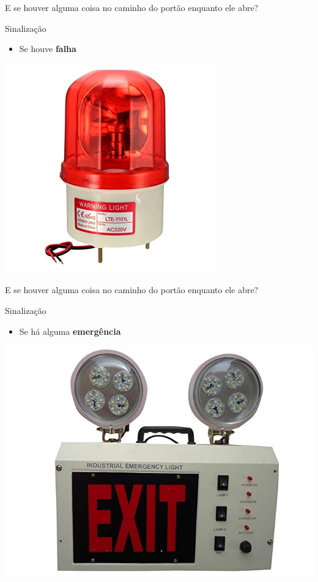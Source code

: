 \begin{frame}{E se houver alguma coisa no caminho do portão enquanto ele abre?}
	\begin{block}{Sinalização}
		\begin{itemize}
			\item Se houve \textbf{falha}
		\end{itemize}
	\end{block}
	\medskip
	\centerline{\includegraphics[width=0.4\linewidth]{Figuras/Ch05/fig16.jpg}}
\end{frame}

\begin{frame}{E se houver alguma coisa no caminho do portão enquanto ele abre?}
	\begin{block}{Sinalização}
		\begin{itemize}
			\item Se há alguma \textbf{emergência}
		\end{itemize}
	\end{block}
	\medskip
	\centerline{\includegraphics[width=0.5\linewidth]{Figuras/Ch05/fig17.jpg}}
\end{frame}



